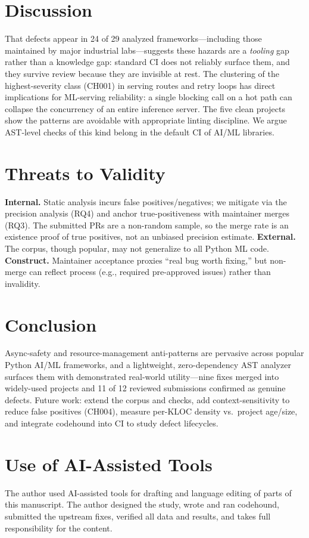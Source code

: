 \documentclass[conference]{IEEEtran}
\begin{document}
\section{Discussion}
That defects appear in 24 of 29 analyzed frameworks---including those maintained by major industrial labs---suggests these hazards are a \emph{tooling} gap rather than a knowledge gap: standard CI does not reliably surface them, and they survive review because they are invisible at rest. The clustering of the highest-severity class (CH001) in serving routes and retry loops has direct implications for ML-serving reliability: a single blocking call on a hot path can collapse the concurrency of an entire inference server. The five clean projects show the patterns are avoidable with appropriate linting discipline. We argue AST-level checks of this kind belong in the default CI of AI/ML libraries.

\section{Threats to Validity}
\textbf{Internal.} Static analysis incurs false positives/negatives; we mitigate via the precision analysis (RQ4) and anchor true-positiveness with maintainer merges (RQ3). The submitted PRs are a non-random sample, so the merge rate is an existence proof of true positives, not an unbiased precision estimate. \textbf{External.} The corpus, though popular, may not generalize to all Python ML code. \textbf{Construct.} Maintainer acceptance proxies ``real bug worth fixing,'' but non-merge can reflect process (e.g., required pre-approved issues) rather than invalidity.

\section{Conclusion}
Async-safety and resource-management anti-patterns are pervasive across popular Python AI/ML frameworks, and a lightweight, zero-dependency AST analyzer surfaces them with demonstrated real-world utility---nine fixes merged into widely-used projects and 11 of 12 reviewed submissions confirmed as genuine defects. Future work: extend the corpus and checks, add context-sensitivity to reduce false positives (CH004), measure per-KLOC density vs.\ project age/size, and integrate codehound into CI to study defect lifecycles.

\section*{Use of AI-Assisted Tools}
The author used AI-assisted tools for drafting and language editing of parts of this manuscript. The author designed the study, wrote and ran codehound, submitted the upstream fixes, verified all data and results, and takes full responsibility for the content.
\end{document}
